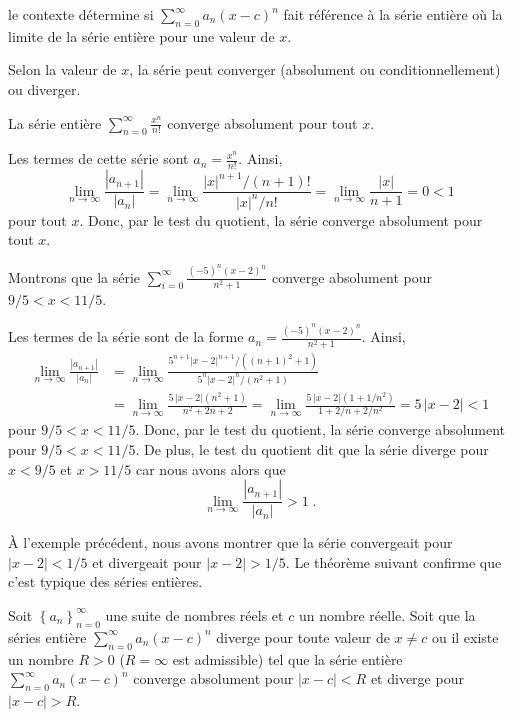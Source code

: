 {\begin{focus}{\dfn}
le contexte détermine si $\displaystyle \sum_{n=0}^\infty a_n (x-c)^n$ fait
référence à la série entière où la limite de la série entière pour une valeur
de $x$.
\end{focus}

Selon la valeur de $x$, la série peut converger (absolument ou
conditionnellement) ou diverger.

\begin{egg}
La série entière $\displaystyle \sum_{n=0}^\infty \frac{x^n}{n!}$ converge
absolument pour tout $x$.

Les termes de cette série sont $\displaystyle a_n = \frac{x^n}{n!}$.
Ainsi,
\[
\lim_{n\rightarrow \infty} \frac{|a_{n+1}|}{|a_n|}
= \lim_{n\rightarrow \infty} \frac{|x|^{n+1}/(n+1)!}{|x|^n/n!}
= \lim_{n\rightarrow \infty} \frac{|x|}{n+1} = 0 < 1
\]
pour tout $x$.  Donc, par le test du quotient, la série converge absolument
pour tout $x$.
\label{exp_serie_egg}
\end{egg}

\begin{egg}
Montrons que la série
$\displaystyle \sum_{i=0}^\infty \frac{(-5)^n(x-2)^n}{n^2+1}$ converge
absolument pour $9/5 < x < 11/5$.

Les termes de la série sont de la forme
$\displaystyle a_n = \frac{(-5)^n(x-2)^n}{n^2+1}$.
Ainsi,
\begin{align*}
\lim_{n\rightarrow \infty} \frac{|a_{n+1}|}{|a_n|}
&= \lim_{n\rightarrow \infty} \frac{5^{n+1}|x-2|^{n+1}/((n+1)^2+1)}
{5^n|x-2|^n/(n^2+1)} \\
&= \lim_{n\rightarrow \infty} \frac{5\,|x-2|(n^2+1)}{n^2+2n+2}
= \lim_{n\rightarrow \infty} \frac{5\,|x-2|(1+1/n^2)}{1+2/n+2/n^2}
 = 5\,|x-2| < 1
\end{align*}
pour $9/5 < x < 11/5$.  Donc, par le test du quotient, la
série converge absolument pour $9/5 < x < 11/5$.
De plus, le test du quotient dit que la série diverge pour $x<9/5$ et
$x>11/5$ car nous avons alors que
\[
\lim_{n\rightarrow \infty} \frac{|a_{n+1}|}{|a_n|} > 1 \; .
\]
\label{entiere_egg}
\end{egg}

À l'exemple précédent, nous avons montrer que la série convergeait
pour $|x-2|<1/5$ et divergeait pour $|x-2|>1/5$.  Le théorème suivant
confirme que c'est typique des séries entières.

\begin{focus}{\thm}
Soit $\displaystyle \left\{a_n\right\}_{n=0}^\infty$ une suite de nombres
réels et $c$ un nombre réelle.  Soit que la séries entière
$\displaystyle \sum_{n=0}^\infty a_n (x-c)^n$ diverge pour toute valeur
de $x \neq c$ ou il existe un nombre $R>0$ ($R=\infty$ est admissible)
tel que la série entière $\displaystyle \sum_{n=0}^\infty a_n (x-c)^n$
converge absolument pour $|x-c|<R$ et diverge pour $|x-c|>R$.
\end{focus}

}

